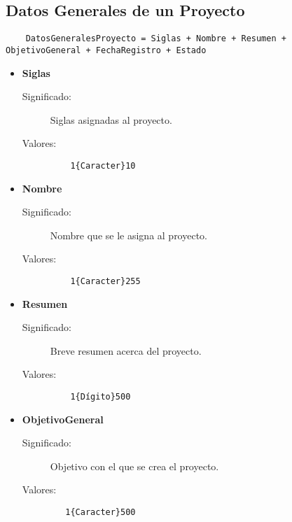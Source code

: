 \subsection{Datos Generales de un Proyecto}
\label{dd:dgp}
\begin{lstlisting}
    DatosGeneralesProyecto = Siglas + Nombre + Resumen + ObjetivoGeneral + FechaRegistro + Estado
\end{lstlisting}
 \begin{itemize}

    \item \textbf{Siglas}
      \begin{description}
        \item [Significado:] Siglas asignadas al proyecto.
        \item [Valores:]{\begin{lstlisting}
	1{Caracter}10\end{lstlisting}}\end{description}

    \item \textbf{Nombre}
      \begin{description}
        \item [Significado:] Nombre que se le asigna al proyecto.
        \item [Valores:]{\begin{lstlisting}
	1{Caracter}255
\end{lstlisting}}\end{description}
 
\item \textbf{Resumen}
      \begin{description}
        \item [Significado:] Breve resumen acerca del proyecto.
        \item [Valores:]{\begin{lstlisting}
	1{Dígito}500
\end{lstlisting}}\end{description}

    \item \textbf{ObjetivoGeneral}
      \begin{description}
        \item [Significado:] Objetivo con el que se crea el proyecto.
        \item [Valores:]{\begin{lstlisting}
   1{Caracter}500
\end{lstlisting}}\end{description}


\end{itemize}
